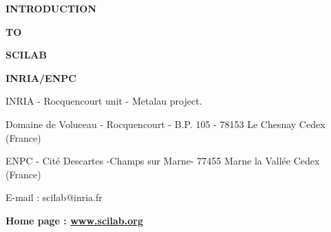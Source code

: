 

\pagestyle{empty}



\vspace{8.cm}

{\Huge\bf  {INTRODUCTION}}

\bigskip

{\Huge\bf  {TO}}

\bigskip

{\Huge\bf  {SCILAB}}



\vspace{3.cm}


{\Large\bf
INRIA/ENPC}

{\normalsize\bf

\vspace{12.cm}

INRIA - Rocquencourt unit - Metalau project.

 Domaine de Voluceau - Rocquencourt - B.P. 105 - 78153 Le Chesnay Cedex (France)

ENPC - Cit\'e Descartes -Champs sur Marne- 77455 Marne la Vall\'ee Cedex (France)

E-mail : scilab@inria.fr}

{\normalsize\bf Home page : \href{http://www.scilab.org}{www.scilab.org}}

\newpage
\mbox{ }
\newpage



